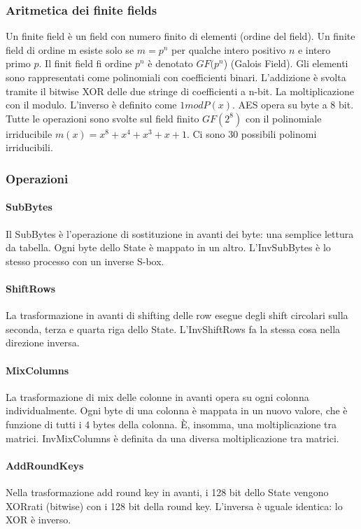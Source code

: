 \documentclass[11pt]{article}
\begin{document}
\subsubsection{Aritmetica dei finite fields}
Un finite field è un field con numero finito di elementi (ordine del field). Un finite field di ordine m esiste solo se $m=p^n$ per qualche intero positivo $n$ e intero primo $p$.
Il finit field fi ordine $p^n$ è denotato $GF(p^n$) (Galois Field). Gli elementi sono rappresentati come polinomiali con coefficienti binari. L'addizione è svolta tramite il bitwise XOR delle due stringe di coefficienti a n-bit. La moltiplicazione con il modulo. L'inverso è definito come $1 mod P(x)$. AES opera su byte a 8 bit. Tutte le operazioni sono svolte sul field finito $GF(2^8)$ con il polinomiale irriducibile $m(x) = x^8 + x^4 + x^3 + x + 1$. Ci sono 30 possibili polinomi irriducibili. 
\subsubsection{Operazioni}
\paragraph{SubBytes} Il SubBytes è l'operazione di sostituzione in avanti dei byte: una semplice lettura da tabella. Ogni byte dello State è mappato in un altro. L'InvSubBytes è lo stesso processo con un inverse S-box.
\paragraph{ShiftRows} La trasformazione in avanti di shifting delle row esegue degli shift circolari sulla seconda, terza e quarta riga dello State. L'InvShiftRows fa la stessa cosa nella direzione inversa.
\paragraph{MixColumns} La trasformazione di mix delle colonne in avanti opera su ogni colonna individualmente. Ogni byte di una colonna è mappata in un nuovo valore, che è funzione di tutti i 4 bytes della colonna. È, insomma, una moltiplicazione tra matrici.
InvMixColumns è definita da una diversa moltiplicazione tra matrici.
\paragraph{AddRoundKeys} Nella trasformazione add round key in avanti, i 128 bit dello State vengono XORrati (bitwise) con i 128 bit della round key. L'inversa è uguale identica: lo XOR è inverso.
\end{document}
